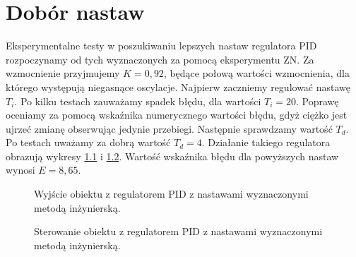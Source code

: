 \chapter{Dobór nastaw}
Eksperymentalne testy w poszukiwaniu lepszych nastaw regulatora PID rozpoczynamy od tych wyznaczonych za pomocą eksperymentu ZN. Za wzmocnienie przyjmujemy $K = 0,92$, będące połową wartości wzmocnienia, dla którego występują niegasnące oscylacje.
Najpierw zaczniemy regulować nastawę $T_i$. Po kilku testach zauważamy spadek błędu, dla wartości $T_i = 20$. Poprawę oceniamy za pomocą wskaźnika numerycznego wartości błędu,
gdyż ciężko jest ujrzeć zmianę obserwując jedynie przebiegi. Następnie sprawdzamy wartość $T_d$. Po testach uważamy za dobrą wartość $T_d = 4$. Działanie takiego regulatora
obrazują wykresy \ref{fig:inz_pid_out} i \ref{fig:inz_pid_ster}. Wartość wskaźnika błędu dla powyższych nastaw wynosi $E = 8,65$.

\begin{figure}[tb]
\centering
{}
\caption{Wyjście obiektu z regulatorem PID z nastawami wyznaczonymi metodą inżynierską.}
\label{fig:inz_pid_out}
\end{figure}

\begin{figure}[tb]
\centering
{}
\caption{Sterowanie obiektu z regulatorem PID z nastawami wyznaczonymi metodą inżynierską.}
\label{fig:inz_pid_ster}
\end{figure}
